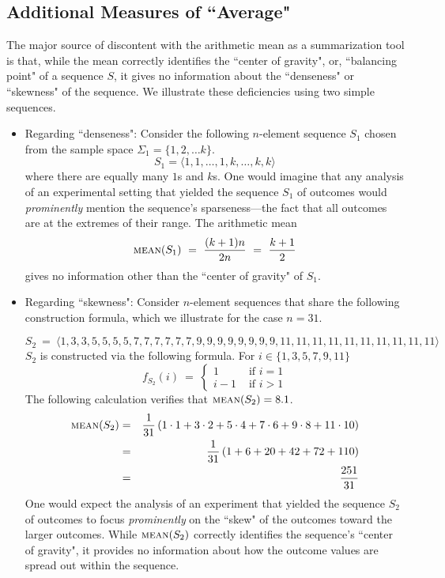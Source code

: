 \subsection{Additional Measures of ``Average"}
\label{sec:median-mode}

The major source of discontent with the arithmetic mean as a summarization tool is that, while the mean correctly identifies the ``center of gravity", or, ``balancing point" of a sequence $S$, it gives no information about the ``denseness" or ``skewness" of the sequence.  We illustrate these deficiencies using two simple sequences.
  
\begin{itemize}
\item
Regarding ``denseness":
Consider the following $n$-element sequence $S_1$ chosen from the sample space $\Sigma_1 = \{1, 2, \ldots k\}$.
\[ S_1 = \langle 1, 1, \ldots, 1, k, \ldots, k, k \rangle \]
where there are equally many $1$s and $k$s.  One would imagine that any analysis of an 
experimental setting that yielded the sequence $S_1$ of outcomes would {\em prominently} mention the sequence's sparseness---the fact that all outcomes are at the extremes of their range.  The arithmetic mean
\[  \mbox{\sc mean}(S_1) \ = \ \frac{(k+1)n}{2n} \ = \ {k+1 \over 2} \]
gives no information other than the ``center of gravity" of $S_1$.

\item
Regarding ``skewness":
Consider $n$-element sequences that share the following construction formula, which
we illustrate for the case $n=31$.

{\small
\[ S_2 \ = \ \langle 
1,
3,3,
5,5,5,5,
7,7,7,7,7,7,
9,9,9,9,9,9,9,9,
11,11,11,11,11,11,11,11,11,11
\rangle \]
} 
\hspace*{-.1in} $S_2$ is constructed via the following formula.  For $i \in \{1,3,5,7,9,11\}$
\[ f_{S_2}(i) \ = \ \left\{ \begin{array}{cl}
1  & \mbox{ if } i=1 \\
 i-1& \mbox{ if } i>1
\end{array}  
\right.
\]
The following calculation verifies that $\mbox{\sc mean}(S_2) = 8.1$. 
\begin{eqnarray*}
\mbox{\sc mean}(S_2)
 & = & 
{1 \over 31}
\left(
1 \cdot 1 +
3 \cdot 2 +
5 \cdot 4 +
7 \cdot 6 +
9 \cdot 8 +
11 \cdot 10
\right)
 \\
  & = & 
{1 \over 31}
\left(
 1 + 6 + 20 + 42 + 72 + 110
\right)
 \\
  & = & 
\frac{251}{31}
\end{eqnarray*}
One would expect the analysis of an experiment that yielded the sequence $S_2$ of outcomes to focus {\em prominently} on the ``skew" of the outcomes toward the larger outcomes.  While $\mbox{\sc mean}(S_2)$ correctly identifies the sequence's ``center of gravity", it provides no information about how the outcome values are spread out within the sequence.
\end{itemize}

